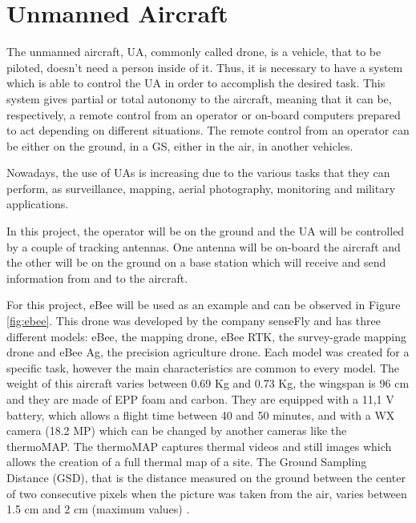 \section{Unmanned Aircraft}\label{sec:drone}

The unmanned aircraft, UA, commonly called drone, is a vehicle, that to be piloted, doesn't need a person inside of it. Thus, it is necessary to have a system which is able to control the UA in order to accomplish the desired task. This system gives partial or total autonomy to the aircraft, meaning that it can be, respectively, a remote control from an operator or on-board computers prepared to act depending on different situations. The remote control from an operator can be either on the ground, in a GS, either in the air, in another vehicles.

Nowadays, the use of UAs is increasing due to the various tasks that they can perform, as surveillance, mapping, aerial photography, monitoring and military applications.

In this project, the operator will be on the ground and the UA will be controlled by a couple of tracking antennas. One antenna will be on-board the aircraft and the other will be on the ground on a base station which will receive and send information from and to the aircraft. 

For this project, eBee will be used as an example and can be observed in Figure \ref{fig:ebee}. This drone was developed by the company senseFly and has three different models: eBee, the mapping drone, eBee RTK, the survey-grade mapping drone and eBee Ag, the precision agriculture drone. Each model was created for a specific task, however the main characteristics are common to every model. The weight of this aircraft varies between 0.69 Kg and 0.73 Kg, the wingspan is 96 cm and they are made of EPP foam and carbon. They are equipped with a 11,1 V battery, which allows a flight time between 40 and 50 minutes, and with a WX camera (18.2 MP) which can be changed by another cameras like the thermoMAP. The thermoMAP captures thermal videos and still images which allows the creation of a full thermal map of a site. The Ground Sampling Distance (GSD), that is the distance measured on the ground between the center of two consecutive pixels when the picture was taken from the air, varies between 1.5 cm and 2 cm (maximum values)  \cite{eBee}. 
 
